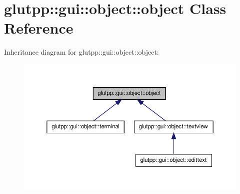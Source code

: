 \hypertarget{classglutpp_1_1gui_1_1object_1_1object}{\section{glutpp\-:\-:gui\-:\-:object\-:\-:object \-Class \-Reference}
\label{classglutpp_1_1gui_1_1object_1_1object}
}


\-Inheritance diagram for glutpp\-:\-:gui\-:\-:object\-:\-:object\-:
\nopagebreak
\begin{figure}[H]
\begin{center}
\leavevmode
\includegraphics[width=350pt]{classglutpp_1_1gui_1_1object_1_1object__inherit__graph}
\end{center}
\end{figure}
